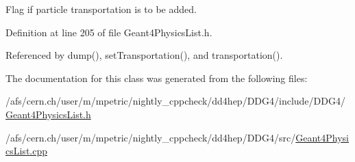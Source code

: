 Flag if particle transportation is to be added. 

Definition at line 205 of file Geant4PhysicsList.h.

Referenced by dump(), setTransportation(), and transportation().

The documentation for this class was generated from the following files:\begin{DoxyCompactItemize}
\item 
/afs/cern.ch/user/m/mpetric/nightly\_\-cppcheck/dd4hep/DDG4/include/DDG4/\hyperlink{_geant4_physics_list_8h}{Geant4PhysicsList.h}\item 
/afs/cern.ch/user/m/mpetric/nightly\_\-cppcheck/dd4hep/DDG4/src/\hyperlink{_geant4_physics_list_8cpp}{Geant4PhysicsList.cpp}\end{DoxyCompactItemize}
